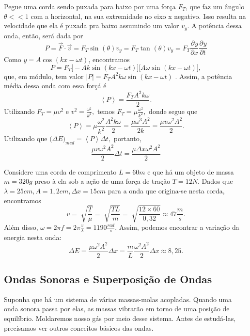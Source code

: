 \documentclass[PhysicsII/physicsII_notes.tex]{subfiles}
\begin{document}
\begin{example}
	Pegue uma corda sendo puxada para baixo por uma força \(F_{T}\), que faz um ângulo \(\theta << 1\) com a horizontal, na sua extremidade no eixo x negativo. Isso resulta
	na velocidade que ela é puxada pra baixo assumindo um valor \(v_{y}\). A potência dessa onda, então, será dada por
	\[
		P = \vec{F}\cdot \vec{v} = F_{T}\sin^{}{(\theta )}v_{y} = F_{T}\tan^{}{(\theta )}v_{y} = F_{T}\frac{\partial^{}y}{\partial x^{}}\frac{\partial^{}y}{\partial t^{}}
	\]
	Como \(y = A\cos^{}{(kx - \omega t)}\), encontramos
	\[
		P = F_{T}\biggl[-Ak\sin^{}{(kx - \omega t)}\biggr]\biggl[A\omega \sin^{}{(kx - \omega t)}\biggr],
	\]
	que, em módulo, tem valor \(|P|=F_{T}A^{2}k\omega \sin^{}{(kx-\omega t)}\) . Assim, a potência média dessa onda com essa forçá é
	\[
		\left< P \right> = \frac{F_{T}A^{2}k\omega }{2}.
	\]
	Utilizando \(F_{T} = \mu v^{2}\) e \(v^{2} = \frac{\omega ^{2}}{k^{2}},\) temos \(F_{T} = \mu \frac{\omega^{2}}{k^{2}},\) donde segue que
	\[
		\left< P \right> = \mu \frac{\omega^{2}}{k^{2}}\frac{A^{2}k\omega }{2} = \frac{\mu\omega^{3}A^{2}}{2k} = \frac{\mu v \omega^{2}A^{2}}{2}.
	\]
	Utilizando que \(\biggl(\Delta E\biggr)_{med} = \left< P \right> \Delta t,\) portanto,
	\[
		\frac{\mu v \omega ^{2}A^{2}}{2}\Delta t = \frac{\mu\Delta x\omega^{2}A^{2}}{2}
	\]
\end{example}
\begin{example}
	Considere uma corda de comprimento \(L = 60m\) e que há um objeto de massa \(m =320g\) preso à ela sob a ação de uma força de tração
	\(T = 12N\). Dados que \(\lambda = 25cm, A = 1,2cm, \Delta x = 15cm\) para a onda que origina-se nesta corda, encontramos
	\[
		v = \sqrt[]{\frac{T}{\mu}} = \sqrt[]{\frac{TL}{m}} = \sqrt[]{\frac{12\times 60}{0,32}}\approx 47\frac{m}{s}.
	\]
	Além disso, \(\omega = 2\pi f = 2\pi \frac{v}{\lambda } = 1190\frac{rad}{s}.\) Assim, podemos encontrar a variação da energia nesta onda:
	\[
		\Delta E = \frac{\mu\omega ^{2}A^{2}}{2}\Delta x = \frac{m}{L}\frac{\omega ^{2}A^{2}}{2}\Delta x\approx 8,25.
	\]
\end{example}
\subsection{Ondas Sonoras e Superposição de Ondas}
Suponha que há um sistema de várias massas-molas acopladas. Quando uma onda sonora passa por elas, as massas vibrarão em torno de uma posição de equilíbrio.
Moldaremos nosso gás por meio desse sistema. Antes de estudá-las, precisamos ver outros conceitos básicos das ondas.
\end{document}
